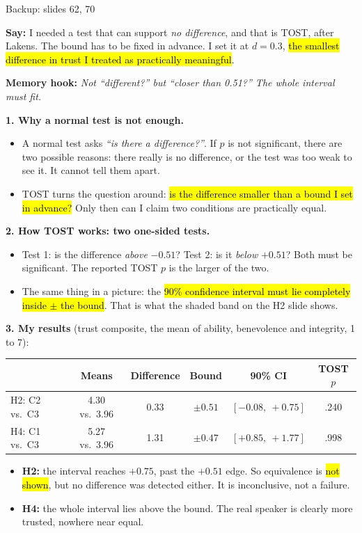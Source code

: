 \documentclass[11pt,a4paper]{article}
\newcommand{\key}[1]{\hl{#1}}
\newcommand{\hook}[1]{{\setlength{\fboxsep}{1.5pt}\colorbox{hlyellow}{\color{black}#1}}}
\newcounter{qn}
\newcommand{\Q}[2]{\needspace{9\baselineskip}\stepcounter{qn}\vspace{0.9em}{\large\bfseries\color{knblue}Q\arabic{qn}. #1}\hfill{\small\color{kngrey}Backup: #2}\par\vspace{0.2em}}
\newcommand{\say}[1]{\begin{tcolorbox}[colback=knlight,colframe=knblue,boxrule=0.5pt,left=6pt,right=6pt,top=4pt,bottom=4pt]\textbf{Say:} #1\end{tcolorbox}}
\begin{document}
\Q{Why TOST with $d=0.3$?}{slides 62, 70}

\say{I needed a test that can support \emph{no difference}, and that is TOST, after Lakens. The bound has to be fixed in advance. I set it at $d=0.3$, \key{the smallest difference in trust I treated as practically meaningful}.}

{\small\color{kngrey}\textbf{Memory hook:} \hook{\emph{Not ``different?'' but ``closer than 0.51?'' The whole interval must fit.}}}

\textbf{1. Why a normal test is not enough.}
\begin{itemize}
  \item A normal test asks \emph{``is there a difference?''}. If $p$ is not significant, there are two possible reasons: there really is no difference, or the test was too weak to see it. It cannot tell them apart.
  \item TOST turns the question around: \key{is the difference smaller than a bound I set in advance?} Only then can I claim two conditions are practically equal.
\end{itemize}

\textbf{2. How TOST works: two one-sided tests.}
\begin{itemize}
  \item Test 1: is the difference \emph{above} $-0.51$? Test 2: is it \emph{below} $+0.51$? Both must be significant. The reported TOST $p$ is the larger of the two.
  \item The same thing in a picture: the \key{90\% confidence interval must lie completely inside $\pm$ the bound}. That is what the shaded band on the H2 slide shows.
\end{itemize}

\textbf{3. My results} (trust composite, the mean of ability, benevolence and integrity, 1 to 7):

\vspace{0.2em}
{\small
\renewcommand{\arraystretch}{1.25}
\begin{tabular}{@{}lccccc@{}}
\toprule
& \textbf{Means} & \textbf{Difference} & \textbf{Bound} & \textbf{90\% CI} & \textbf{TOST $p$} \\
\midrule
H2: C2 vs.\ C3 & 4.30 vs.\ 3.96 & 0.33 & $\pm0.51$ & $[-0.08,\ +0.75]$ & .240 \\
H4: C1 vs.\ C3 & 5.27 vs.\ 3.96 & 1.31 & $\pm0.47$ & $[+0.85,\ +1.77]$ & .998 \\
\bottomrule
\end{tabular}\par}
\vspace{0.3em}
\begin{itemize}
  \item \textbf{H2:} the interval reaches $+0.75$, past the $+0.51$ edge. So equivalence is \key{not shown}, but no difference was detected either. It is inconclusive, not a failure.
  \item \textbf{H4:} the whole interval lies above the bound. The real speaker is clearly more trusted, nowhere near equal.
\end{itemize}
\end{document}
